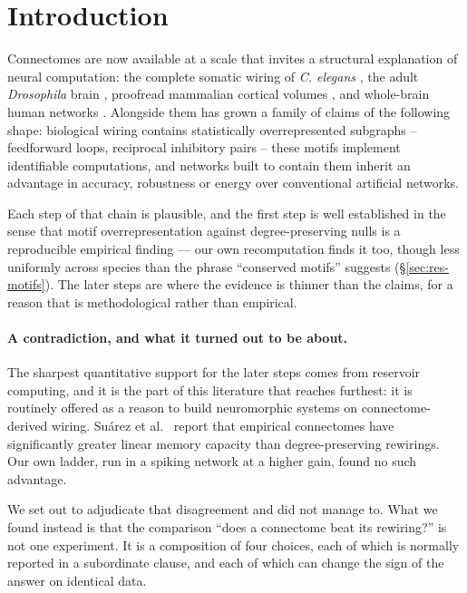 \section{Introduction}
\label{sec:intro}

Connectomes are now available at a scale that invites a structural explanation of
neural computation: the complete somatic wiring of \textit{C. elegans}
\cite{cook2019whole}, the adult \textit{Drosophila} brain \cite{dorkenwald2024neuronal,
lin2024network}, proofread mammalian cortical volumes \cite{microns2025functional},
and whole-brain human networks \cite{vanessen2012human}. Alongside them has grown a
family of claims of the following shape: biological wiring contains statistically
overrepresented subgraphs -- feedforward loops, reciprocal inhibitory pairs -- these
motifs implement identifiable computations, and networks built to contain them
inherit an advantage in accuracy, robustness or energy over conventional artificial
networks.

Each step of that chain is plausible, and the first step is well established in the
sense that motif overrepresentation against degree-preserving nulls is a reproducible
empirical finding \cite{milo2002network,milo2004superfamilies,sporns2004motifs} --- our
own recomputation finds it too, though less uniformly across species than the phrase
``conserved motifs'' suggests (\S\ref{sec:res-motifs}). The later steps are where the
evidence is thinner than the claims, for a reason that is methodological rather than
empirical.

\paragraph{A contradiction, and what it turned out to be about.}
The sharpest quantitative support for the later steps comes from reservoir computing, and
it is the part of this literature that reaches furthest: it is routinely offered as a
reason to build neuromorphic systems on connectome-derived wiring.
Su\'arez et al.~\cite{suarez2024connectome} report that empirical connectomes have
significantly greater linear memory capacity than degree-preserving rewirings. Our own
ladder, run in a spiking network at a higher gain, found no such advantage.

We set out to adjudicate that disagreement and did not manage to. What we found instead
is that the comparison ``does a connectome beat its rewiring?'' is not one experiment. It
is a composition of four choices, each of which is normally reported in a subordinate
clause, and each of which can change the sign of the answer on identical data.

